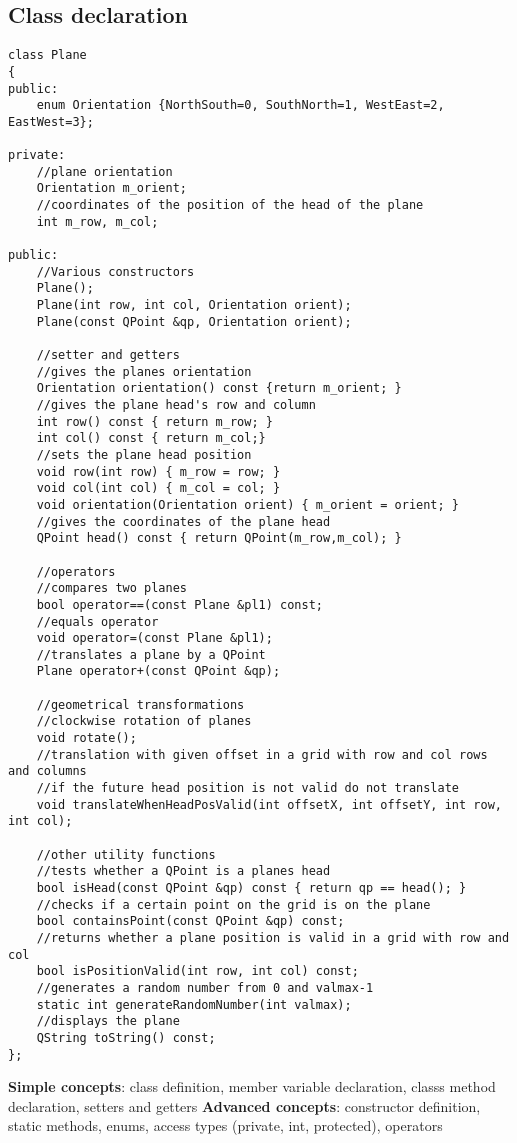 \documentclass{article}
\begin{document}
\subsection{Class declaration}
\begin{lstlisting}
class Plane
{
public:
    enum Orientation {NorthSouth=0, SouthNorth=1, WestEast=2, EastWest=3};

private:
    //plane orientation
    Orientation m_orient;
    //coordinates of the position of the head of the plane
    int m_row, m_col;

public:
    //Various constructors
    Plane();
    Plane(int row, int col, Orientation orient);
    Plane(const QPoint &qp, Orientation orient);

    //setter and getters
    //gives the planes orientation
    Orientation orientation() const {return m_orient; }
    //gives the plane head's row and column
    int row() const { return m_row; }
    int col() const { return m_col;}
    //sets the plane head position
    void row(int row) { m_row = row; }
    void col(int col) { m_col = col; }
    void orientation(Orientation orient) { m_orient = orient; }
    //gives the coordinates of the plane head
    QPoint head() const { return QPoint(m_row,m_col); }

    //operators
    //compares two planes
    bool operator==(const Plane &pl1) const;
    //equals operator
    void operator=(const Plane &pl1);
    //translates a plane by a QPoint
    Plane operator+(const QPoint &qp);

    //geometrical transformations
    //clockwise rotation of planes
    void rotate();
    //translation with given offset in a grid with row and col rows and columns
    //if the future head position is not valid do not translate
    void translateWhenHeadPosValid(int offsetX, int offsetY, int row, int col);

    //other utility functions
    //tests whether a QPoint is a planes head
    bool isHead(const QPoint &qp) const { return qp == head(); }
    //checks if a certain point on the grid is on the plane
    bool containsPoint(const QPoint &qp) const;
    //returns whether a plane position is valid in a grid with row and col
    bool isPositionValid(int row, int col) const;
    //generates a random number from 0 and valmax-1
    static int generateRandomNumber(int valmax);
    //displays the plane
    QString toString() const;
};
\end{lstlisting}
\textbf{Simple concepts}: class definition, member variable declaration, classs method declaration, setters and getters\newline
\textbf{Advanced concepts}: constructor definition, static methods, enums, access types (private, int, protected), operators\newline
{}
\end{document}
